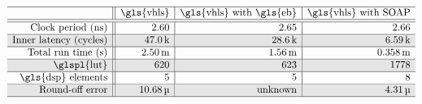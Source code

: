 \begin{table}[ht]
    \centering
    \renewcommand\arraycolsep{1.0mm}
    \newcommand\unitk{\,\text{k}}
    \newcommand\unitm{\,\text{m}}
    \newcommand\unitmu{\,\text{\textmu}}
    \newcommand\unitM{\,\text{M}}
    \newcommand\unitG{\,\text{G}}
    \newcommand\Mid[1]{\multirow{2}*{$#1$}}
    \newcommand\Shade{\cellcolor{black!10}}
    \newcommand\name[1]{\texttt{\scriptsize #1}}
    \caption{%
        Comparison among the optimized implementations generated by
        \gls{vhls}'s expression balancing and our optimizer.  The row ``Total
        run time (s)'' indicates the wall-clock time in seconds of running the
        synthesized circuits.
    }\label{lo:tab:seidel_results}
    $\begin{array}{r||r|r|r}
        \hline
        \multicolumn{1}{c||}{} &
        \multicolumn{1}{c|}{\text{\gls{vhls}}} &
        \multicolumn{1}{c|}{\text{\gls{vhls} with \gls{eb}}} &
        \multicolumn{1}{c}{\text{\gls{vhls} with \soap}}
        \\ \hline\hline

        \text{Clock period (ns)} &
        2.60 & 2.65 & 2.66 \\ \hline

        \Shade \text{Inner latency (cycles)} &
        \Shade 47.0\unitk & \Shade 28.6\unitk & \Shade 6.59\unitk \\ \hline

        \text{Total run time (s)} &
        2.50\unitm & 1.56\unitm & 0.358\unitm \\ \hline

        \Shade \text{\glspl{lut}} &
        \Shade 620 & \Shade 623 & \Shade 1778 \\ \hline

        \text{\gls{dsp} elements} &
        5 & 5 & 8 \\ \hline

        \Shade \text{Round-off error} &
        \Shade 10.68\unitmu &
        \Shade \text{unknown} &
        \Shade 4.31\unitmu \\ \hline
    \end{array}$
\end{table}
